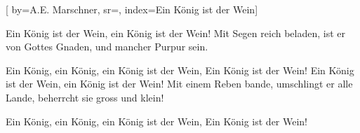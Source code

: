 

[ 		%
	by={A.E. Marschner},					%
	sr={},					%
	index={Ein König ist der Wein}]						%
	

\beginverse*						%
Ein König ist der Wein, ein König ist der Wein!
Mit Segen reich beladen, ist er von Gottes Gnaden, 
und mancher Purpur sein.
\endverse							%

\beginverse*						%
Ein König, ein König, ein König ist der Wein,
Ein König ist der Wein!
\endverse
\beginverse*
Ein König ist der Wein, ein König ist der Wein!
Mit einem Reben bande, umschlingt er alle Lande, 
beherrcht sie gross und klein!
\endverse

\beginverse*
Ein König, ein König, ein König ist der Wein,
Ein König ist der Wein!
\endverse

\endsong							%